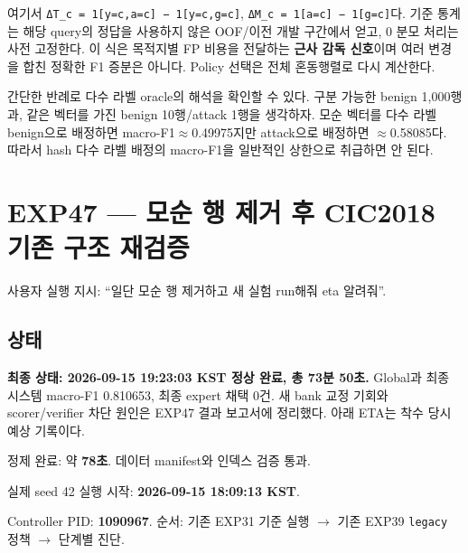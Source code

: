 여기서 \texttt{ΔT\_\allowbreak{}\allowbreak{}c =\allowbreak{}\allowbreak{} 1\allowbreak{}[y=\allowbreak{}\allowbreak{}c,\allowbreak{}a=\allowbreak{}\allowbreak{}c\allowbreak{}] − 1[y=\allowbreak{}\allowbreak{}c,\allowbreak{}g=\allowbreak{}\allowbreak{}c]}, \texttt{ΔM\_\allowbreak{}\allowbreak{}c =\allowbreak{}\allowbreak{} 1\allowbreak{}[a=\allowbreak{}\allowbreak{}c] − \allowbreak{}1[g=\allowbreak{}\allowbreak{}c]}다. 기준 통계는 해당 query의 정답을 사용하지 않은 OOF/\allowbreak{}이전 개발 구간에서 얻고, 0 분모 처리는 사전 고정한다. 이 식은 목적지별 FP 비용을 전달하는 \textbf{근사 감독 신호}이며 여러 변경을 합친 정확한 F1 증분은 아니다. Policy 선택은 전체 혼동행렬로 다시 계산한다.

간단한 반례로 다수 라벨 oracle의 해석을 확인할 수 있다. 구분 가능한 benign 1,000행과, 같은 벡터를 가진 benign 10행/\allowbreak{}attack 1행을 생각하자. 모순 벡터를 다수 라벨 benign으로 배정하면 macro-F1\ensuremath{\approx}0.49975지만 attack으로 배정하면 \ensuremath{\approx}0.58085다. 따라서 hash 다수 라벨 배정의 macro-F1을 일반적인 상한으로 취급하면 안 된다.



\section{EXP47 — 모순 행 제거 후 CIC2018 기존 구조 재검증}
사용자 실행 지시: “일단 모순 행 제거하고 새 실험 run해줘 eta 알려줘”.

\subsection{상태}
\textbf{최종 상태: 2026-09-15 19:23:03 KST 정상 완료, 총 73분 50초.} Global과 최종 시스템 macro-F1 0.810653, 최종 expert 채택 0건. 새 bank 교정 기회와 scorer/\allowbreak{}verifier 차단 원인은 EXP47 결과 보고서에 정리했다. 아래 ETA는 착수 당시 예상 기록이다.

\par\noindent \textbullet\enspace 정제 완료: 약 \textbf{78초}. 데이터 manifest와 인덱스 검증 통과.


\par\noindent \textbullet\enspace 실제 seed 42 실행 시작: \textbf{2026-09-15 18:09:13 KST}.


\par\noindent \textbullet\enspace Controller PID: \textbf{1090967}. 순서: 기존 EXP31 기준 실행  \ensuremath{\rightarrow}  기존 EXP39 \texttt{legacy} 정책  \ensuremath{\rightarrow}  단계별 진단.


